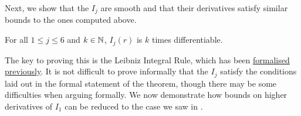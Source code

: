 Next, we show that the $I_j$ are smooth and that their derivatives satisfy similar bounds to the ones computed above.

\begin{boxlemma}\label{Ch4:Lemma:Ij_Smooth}
    For all $1 \leq j \leq 6$ and $k \in \mathbb{N}$, $I_j(r)$ is $k$ times differentiable.
\end{boxlemma}
The key to proving this is the Leibniz Integral Rule, which has been \href{https://github.com/leanprover-community/mathlib4/blob/dd2606726d6b0601d394911f9e7a6fa0f01367a3/Mathlib/Analysis/Calculus/ParametricIntegral.lean#L281-L303}{formalised previously}. It is not difficult to prove informally that the $I_j$ satisfy the conditions laid out in the formal statement of the theorem, though there may be some difficulties when arguing formally. We now demonstrate how bounds on higher derivatives of $I_1$ can be reduced to the case we saw in .

